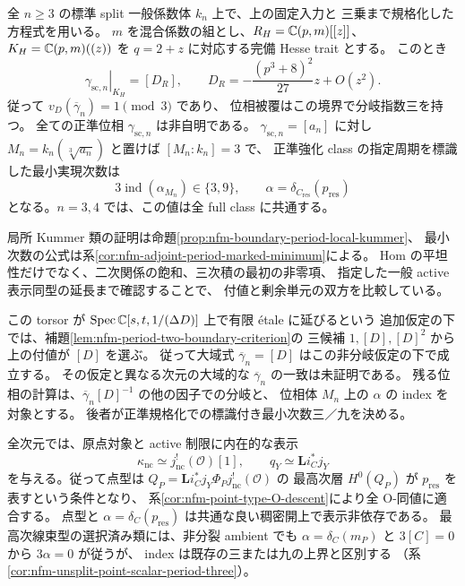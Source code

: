 \begin{maintheorem}
\label{main:nfm-period-hesse-boundary}
全 $n\ge3$ の標準 split 一般係数体 $k_n$ 上で、上の固定入力と
三乗まで規格化した方程式を用いる。
$m$ を混合係数の組とし、$R_H=\mathbb C(p,m)[[z]]$、
$K_H=\mathbb C(p,m)((z))$ を $q=2+z$ に対応する完備 Hesse trait とする。
このとき
\[
 \left.\gamma_{\mathrm{sc},n}\right|_{K_H}=[D_R],\qquad
 D_R=-\frac{(p^3+8)^2}{27}z+O(z^2).
\]
従って $v_D(\overline\gamma_n)=1\pmod3$ であり、
位相被覆はこの境界で分岐指数三を持つ。
全ての正準位相 $\gamma_{\mathrm{sc},n}$ は非自明である。
$\gamma_{\mathrm{sc},n}=[a_n]$ に対し
$M_n=k_n(\sqrt[3]{a_n})$ と置けば $[M_n:k_n]=3$ で、
正準強化 class の指定周期を標識した最小実現次数は
\[
 3\operatorname{ind}(\alpha_{M_n})\in\{3,9\},
 \qquad \alpha=\delta_{C_{\mathrm{res}}}(p_{\mathrm{res}})
\]
となる。$n=3,4$ では、この値は全 full class に共通する。
\end{maintheorem}

局所 Kummer 類の証明は命題\ref{prop:nfm-boundary-period-local-kummer}、
最小次数の公式は系\ref{cor:nfm-adjoint-period-marked-minimum}による。
Hom の平坦性だけでなく、二次関係の飽和、三次積の最初の非零項、
指定した一般 active 表示同型の延長まで確認することで、
付値と剰余単元の双方を比較している。

この torsor が $\operatorname{Spec}\mathbb C[s,t,1/(\Delta D)]$ 上で有限 \'etale に延びるという
追加仮定の下では、補題\ref{lem:nfm-period-two-boundary-criterion}の
三候補 $1,[D],[D]^2$ から上の付値が $[D]$ を選ぶ。
従って大域式 $\overline\gamma_n=[D]$ はこの非分岐仮定の下で成立する。
その仮定と異なる次元の大域的な $\overline\gamma_n$ の一致は未証明である。
残る位相の計算は、$\overline\gamma_n[D]^{-1}$ の他の因子での分岐と、
位相体 $M_n$ 上の $\alpha$ の index を対象とする。
後者が正準規格化での標識付き最小次数三／九を決める。

全次元では、原点対象と active 制限に内在的な表示
\[
 \kappa_{\mathrm{nc}}\simeq j_{\mathrm{nc}}^!(\mathcal O)[1],
 \qquad q_Y\simeq\mathbf Li_C^*j_Y
\]
を与える。従って点型は
$Q_P=\mathbf Li_C^*j_Y\Phi_Pj_{\mathrm{nc}}^!(\mathcal O)$ の
最高次層 $H^0(Q_P)$ が $p_{\mathrm{res}}$ を表すという条件となり、
系\ref{cor:nfm-point-type-O-descent}により全 O-同値に適合する。
点型と $\alpha=\delta_C(p_{\mathrm{res}})$ は共通な良い稠密開上で表示非依存である。
最高次線束型の選択済み類には、非分裂 ambient でも
$\alpha=\delta_C(m_P)$ と $3[C]=0$ から $3\alpha=0$ が従うが、
index は既存の三または九の上界と区別する
（系\ref{cor:nfm-unsplit-point-scalar-period-three}）。

